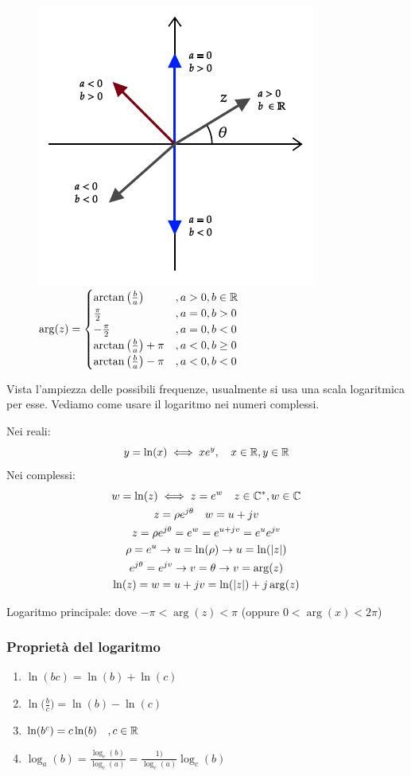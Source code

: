 \begin{figure}[H]
	\centering
	\includegraphics[width=0.4\linewidth, valign=c]{immagini/cap6_Bode/argCompl.pdf}\quad
	$ \displaystyle \arg(z) =
	\begin{cases}
		\arctan \big(\frac{b}{a}\big) &,a>0, b\in \mathbb{R}\\
		\frac{\pi}{2}&,a=0, b>0\\
		-\frac{\pi}{2}&,a=0, b<0\\
		\arctan \big(\frac{b}{a}\big)+\pi &,a<0, b\ge 0\\
		\arctan \big(\frac{b}{a}\big)-\pi &,a<0, b< 0
	\end{cases} $
\end{figure}

Vista l'ampiezza delle possibili frequenze, usualmente si usa una scala logaritmica per esse. Vediamo come usare il logaritmo nei numeri complessi.

Nei reali: 
\begin{equation*}
	y=\ln (x) \iff x e^y, \quad x \in \mathbb{R}, y \in \mathbb{R} 
\end{equation*}
Nei complessi: %
\begin{gather*}
	w = \ln (z) \iff z=e^w \quad z \in \mathbb{C}^*, w \in \mathbb{C} \\
	z=\rho e^{j \theta} \quad w=u+jv\\
	z= \rho e^{j \theta} = e^w=e^{u+jv} = e^u e^{jv}\\
	\rho = e^u \rightarrow u = \ln(\rho) \rightarrow u =\ln(\lvert z\rvert)\\
	e^{j\theta} = e^{jv} \rightarrow v = \theta \rightarrow v= \arg (z)\\
	\ln (z) = w = u+jv = \ln (\lvert z\rvert) + j \arg (z)
\end{gather*}

Logaritmo principale: dove $ -\pi < \arg (z) < \pi $ (oppure $ 0< \arg (x) <2\pi $)

\subsubsection{Proprietà del logaritmo}
\begin{enumerate}
	\item $ \ln ( b c) = \ln (b) + \ln (c) $
	\item $ \ln \Big(\frac{b}{c}\Big) = \ln (b) - \ln (c) $
	\item $ \ln (b^c) = c \ln (b) \quad ,c \in \mathbb{R}$
	\item $ \log_a (b)  = \frac{\log_c (b)}{\log_c (a)}=\frac{1)}{\log_c (a)}\log_c (b)$
\end{enumerate}


